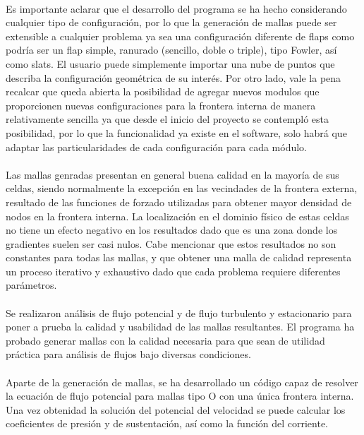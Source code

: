 \documentclass[letterpaper, openright, 12pt]{book}
\begin{document}
\paragraph*{}
    Es importante aclarar que el desarrollo del programa se ha hecho
    considerando cualquier tipo de configuración, por lo que la generación de
    mallas puede ser extensible a cualquier problema ya sea una configuración
    diferente de flaps como podría ser un flap simple, ranurado (sencillo,
    doble o triple), tipo Fowler, así como slats. El usuario puede simplemente
    importar una nube de puntos que describa la configuración geométrica de su
    interés. Por otro lado, vale la pena recalcar que queda abierta la
    posibilidad de agregar nuevos modulos que proporcionen nuevas
    configuraciones para la frontera interna de manera relativamente sencilla
    ya que desde el inicio del proyecto se contempló esta posibilidad, por lo
    que la funcionalidad ya existe en el software, solo habrá que adaptar las
    particularidades de cada configuración para cada módulo.

\paragraph*{}
    Las mallas genradas presentan en general buena calidad en la mayoría de sus
    celdas, siendo normalmente la excepción en las vecindades de la frontera
    externa, resultado de las funciones de forzado utilizadas para obtener
    mayor densidad de nodos en la frontera interna. La localización en el
    dominio físico de estas celdas no tiene un efecto negativo en los
    resultados dado que es una zona donde los gradientes suelen ser casi nulos.
    Cabe mencionar que estos resultados no son constantes para todas las
    mallas, y que obtener una malla de calidad representa un proceso iterativo
    y exhaustivo dado que cada problema requiere diferentes parámetros.

\paragraph*{}
    Se realizaron análisis de flujo potencial y de flujo turbulento y
    estacionario para poner a prueba la calidad y usabilidad de las mallas
    resultantes. El programa ha probado generar mallas con la calidad necesaria
    para que sean de utilidad práctica para análisis de flujos bajo diversas
    condiciones.

\paragraph*{}
    Aparte de la generación de mallas, se ha desarrollado un código capaz de
    resolver la ecuación de flujo potencial para mallas tipo O con una única
    frontera interna. Una vez obtenidad la solución del potencial del velocidad
    se puede calcular los coeficientes de presión y de sustentación, así como
    la función del corriente.
\end{document}
